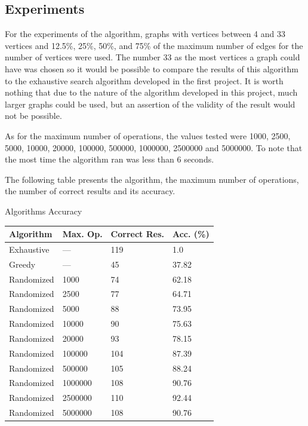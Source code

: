 \documentclass[]{revdetua}
\begin{document}
\subsection{Experiments}

For the experiments of the algorithm, graphs with vertices between 4 and 33 vertices and 12.5\%, 25\%, 50\%, and 75\% of the maximum number of edges for the number of vertices were used. The number 33 as the most vertices a graph could have was chosen so it would be possible to compare the results of this algorithm to the exhaustive search algorithm developed in the first project. It is worth nothing that due to the nature of the algorithm developed in this project, much larger graphs could be used, but an assertion of the validity of the result would not be possible.

As for the maximum number of operations, the values tested were 1000, 2500, 5000, 10000, 20000, 100000, 500000, 1000000, 2500000 and 5000000. To note that the most time the algorithm ran was less than 6 seconds.

The following table presents the algorithm, the maximum number of operations, the number of correct results and its accuracy.

\begin{table}[!ht]
    \centering
    Algorithms Accuracy
    \begin{tabular}{|l|l|l|l|}
    \hline
        Algorithm & Max. Op. & Correct Res. & Acc. (\%) \\ \hline
        Exhaustive & --- & 119 & 1.0 \\ \hline
        Greedy & --- & 45 & 37.82 \\ \hline
        Randomized & 1000 &74 & 62.18 \\ \hline
        Randomized & 2500& 77 & 64.71 \\ \hline
        Randomized & 5000 & 88 & 73.95 \\ \hline
        Randomized & 10000 & 90 & 75.63 \\ \hline
        Randomized & 20000 & 93 & 78.15 \\ \hline
        Randomized & 100000 & 104 & 87.39 \\ \hline
        Randomized & 500000 & 105 & 88.24 \\ \hline
        Randomized & 1000000 & 108 & 90.76 \\ \hline
        Randomized & 2500000 & 110 & 92.44 \\ \hline
        Randomized & 5000000 & 108 & 90.76 \\ \hline
    \end{tabular}
\end{table}
\end{document}
